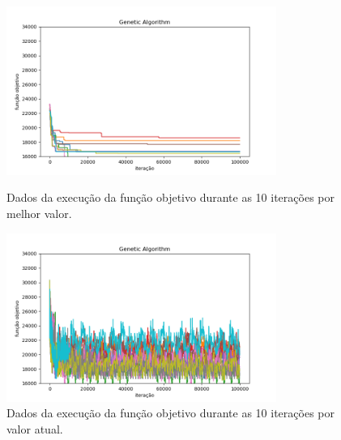 \begin{figure}[H]
\centering
  \begin{minipage}[b]{0.48\textwidth}
    \includegraphics[width=88mm]{imagens/otima/problema-3-genetic-algorithm-funcao-objetivo-best.png}
    \caption{Dados da execução da função objetivo durante as 10 iterações por melhor valor.
    \label{fig:problema-3-genetic-algorithm-funcao-objetivo-best}}
  \end{minipage}
  \hfill
  \begin{minipage}[b]{0.48\textwidth}
    \includegraphics[width=88mm]{imagens/otima/problema-3-genetic-algorithm-funcao-objetivo-value.png}
    \caption{Dados da execução da função objetivo durante as 10 iterações por valor atual.
    \label{fig:problema-3-genetic-algorithm-funcao-objetivo-value}}
  \end{minipage}
\end{figure}